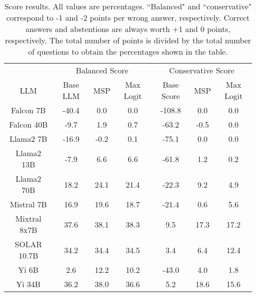\renewcommand\arraystretch{1.2}
\begin{table*}
\centering
\begin{tabular}{c|c|c|c|c|c|c}
& \multicolumn{3}{c|}{Balanced Score} & \multicolumn{3}{c}{Conservative Score} \\ 
LLM & Base LLM & MSP & Max Logit & Base Score & MSP & Max Logit\\ \hline
Falcon 7B & -40.4 & 0.0 & 0.0 & -108.8 & 0.0 & 0.0\\
Falcon 40B & -9.7 & 1.9 & 0.7 & -63.2 & -0.5 & 0.0\\
Llama2 7B & -16.9 & -0.2 & 0.1 & -75.1 & 0.0 & 0.0\\
Llama2 13B & -7.9 & 6.6 & 6.6 & -61.8 & 1.2 & 0.2\\
Llama2 70B & 18.2 & 24.1 & 21.4 & -22.3 & 9.2 & 4.9\\
Mistral 7B & 16.9 & 19.6 & 18.7 & -21.4 & 0.6 & 5.6\\
Mixtral 8x7B & 37.6 & 38.1 & 38.3 & 9.5 & 17.3 & 17.2\\
SOLAR 10.7B & 34.2 & 34.4 & 34.5 & 3.4 & 6.4 & 12.4\\
Yi 6B & 2.6 & 12.2 & 10.2 & -43.0 & 4.0 & 1.8\\
Yi 34B & 36.2 & 38.0 & 36.6 & 5.2 & 18.6 & 15.6\\
\hline
\end{tabular}
\caption{Score results. All values are percentages. ``Balanced" and ``conservative" correspond to -1 and -2 points per wrong answer, respectively. Correct answers and abstentions are always worth +1 and 0 points, respectively. The total number of points is divided by the total number of questions to obtain the percentages shown in the table.}
\label{tab:score}
\end{table*}
